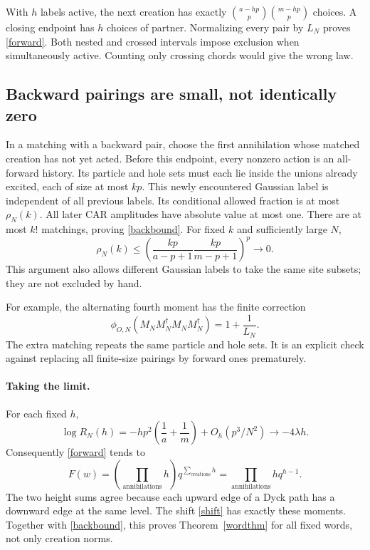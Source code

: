 \documentclass[11pt]{article}
\begin{document}
With $h$ labels active, the next creation has exactly
$\binom{a-hp}{p}\binom{m-hp}{p}$ choices. A closing endpoint has $h$
choices of partner. Normalizing every pair by $L_N$ proves
\eqref{forward}. Both nested and crossed intervals impose exclusion
when simultaneously active. Counting only crossing chords would give
the wrong law.

\newpage
\subsection*{Backward pairings are small, not identically zero}
In a matching with a backward pair, choose the first annihilation
whose matched creation has not yet acted. Before this endpoint, every
nonzero action is an all-forward history. Its particle and hole sets
must each lie inside the unions already excited, each of size at most
$kp$. This newly encountered Gaussian label is independent of all
previous labels. Its conditional allowed fraction is at most
$\rho_N(k)$. All later CAR amplitudes have absolute value at most one.
There are at most $k!$ matchings, proving \eqref{backbound}.
For fixed $k$ and sufficiently large $N$,
\begin{equation}
 \rho_N(k)\le
 \left(\frac{kp}{a-p+1}\frac{kp}{m-p+1}\right)^p\longrightarrow0.
\end{equation}
This argument also allows different Gaussian labels to take the same
site subsets; they are not excluded by hand.

For example, the alternating fourth moment has the finite correction
\begin{equation}\label{backexample}
 \phi_{O,N}(M_NM_N^\dagger M_NM_N^\dagger)=1+\frac1{L_N}.
\end{equation}
The extra matching repeats the same particle and hole sets. It is an
explicit check against replacing all finite-size pairings by forward
ones prematurely.

\paragraph{Taking the limit.}
For each fixed $h$,
\begin{equation}
 \log R_N(h)
 =-hp^2\left(\frac1a+\frac1m\right)+O_h(p^3/N^2)
 \longrightarrow -4\lambda h.
\end{equation}
Consequently \eqref{forward} tends to
\begin{equation}\label{dycklimit}
 F(w)=\left(\prod_{\text{annihilations}}h\right)
 q^{\sum_{\text{creations}}h}
 =\prod_{\text{annihilations}}h q^{h-1}.
\end{equation}
The two height sums agree because each upward edge of a Dyck path
has a downward edge at the same level. The shift \eqref{shift} has
exactly these moments. Together with \eqref{backbound}, this proves
Theorem~\ref{wordthm} for all fixed words, not only creation norms.
\end{document}
